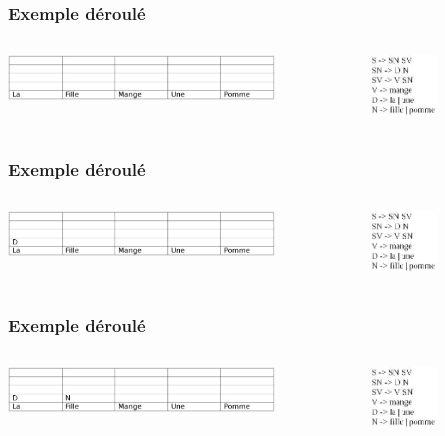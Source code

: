 \documentclass[table]{beamer}
\begin{document}
\begin{frame}
\frametitle{Exemple déroulé}
  \begin{columns}
  \begin{column}{0.6\textwidth}
     \includegraphics[width=200pt,]{1.jpeg}  
  \end{column}
  \begin{column}{0.5\textwidth}
  \includegraphics[width=50pt,]{11.jpeg}  
  \end{column}
  \end{columns}
\end{frame}

\begin{frame}
\frametitle{Exemple déroulé}
  \begin{columns}
  \begin{column}{0.6\textwidth}
     \includegraphics[width=200pt,]{2.jpeg}  
  \end{column}
  \begin{column}{0.5\textwidth}
  \includegraphics[width=50pt,]{11.jpeg}  
  \end{column}
  \end{columns}
\end{frame}

\begin{frame}
\frametitle{Exemple déroulé}
  \begin{columns}
  \begin{column}{0.6\textwidth}
     \includegraphics[width=200pt,]{3.jpeg}  
  \end{column}
  \begin{column}{0.5\textwidth}
  \includegraphics[width=50pt,]{11.jpeg}  
  \end{column}
  \end{columns}
\end{frame}
\end{document}
